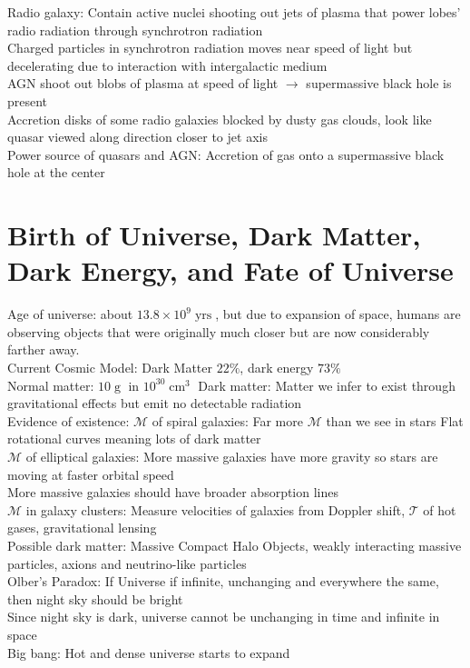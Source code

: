 \documentclass{article}
\DeclareMathOperator{\yrs}{yrs}
\DeclareMathOperator{\cm}{cm}
\DeclareMathOperator{\g}{g}
\begin{document}
Radio galaxy: Contain active nuclei shooting out jets of plasma that power lobes' radio radiation through synchrotron radiation\\
Charged particles in synchrotron radiation moves near speed of light but decelerating due to interaction with intergalactic medium\\
AGN shoot out blobs of plasma at speed of light $\rightarrow$ supermassive black hole is present\\
Accretion disks of some radio galaxies blocked by dusty gas clouds, look like quasar viewed along direction closer to jet axis\\
Power source of quasars and AGN: Accretion of gas onto a supermassive black hole at the center
\newpage
\section{Birth of Universe, Dark Matter, Dark Energy, and Fate of Universe}
Age of universe: about $13.8\times 10^{9}\yrs$, but due to expansion of space, humans are observing objects that were originally much closer but are now considerably farther away.\\
Current Cosmic Model: Dark Matter $22\%$, dark energy $73\%$\\
Normal matter: $10\g$ in $10^{30}\cm^{3}$ \quad Dark matter: Matter we infer to exist through gravitational effects but emit no detectable radiation\\
Evidence of existence:
$\mathcal{M}$ of spiral galaxies: Far more $\mathcal{M}$ than we see in stars \quad Flat rotational curves meaning lots of dark matter\\
$\mathcal{M}$ of elliptical galaxies: More massive galaxies have more gravity so stars are moving at faster orbital speed\\
More massive galaxies should have broader absorption lines\\
$\mathcal{M}$ in galaxy clusters: Measure velocities of galaxies from Doppler shift, $\mathcal{T}$ of hot gases, gravitational lensing\\
Possible dark matter: Massive Compact Halo Objects, weakly interacting massive particles, axions and neutrino-like particles\\
Olber's Paradox: If Universe if infinite, unchanging and everywhere the same, then night sky should be bright\\
Since night sky is dark, universe cannot be unchanging in time and infinite in space\\
Big bang: Hot and dense universe starts to expand\\
\end{document}
